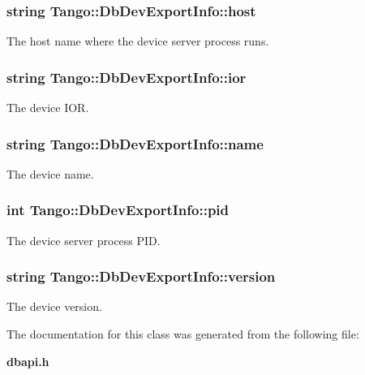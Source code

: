 \subsubsection[{host}]{\setlength{\rightskip}{0pt plus 5cm}string Tango\-::\-Db\-Dev\-Export\-Info\-::host}\label{classTango_1_1DbDevExportInfo_a110e2c28f3921258f4bed17f2543e1ac}


The host name where the device server process runs. 

\subsubsection[{ior}]{\setlength{\rightskip}{0pt plus 5cm}string Tango\-::\-Db\-Dev\-Export\-Info\-::ior}\label{classTango_1_1DbDevExportInfo_a4626c342371b6f0001ac684dc9d22ff5}


The device I\-O\-R. 

\subsubsection[{name}]{\setlength{\rightskip}{0pt plus 5cm}string Tango\-::\-Db\-Dev\-Export\-Info\-::name}\label{classTango_1_1DbDevExportInfo_a24c85a993aeb2e914f7c2c37aa4b949f}


The device name. 

\subsubsection[{pid}]{\setlength{\rightskip}{0pt plus 5cm}int Tango\-::\-Db\-Dev\-Export\-Info\-::pid}\label{classTango_1_1DbDevExportInfo_a140ed6681067ad229263d7f63be0212e}


The device server process P\-I\-D. 

\subsubsection[{version}]{\setlength{\rightskip}{0pt plus 5cm}string Tango\-::\-Db\-Dev\-Export\-Info\-::version}\label{classTango_1_1DbDevExportInfo_af88428a398f79b1f0da9b05bb727f173}


The device version. 



The documentation for this class was generated from the following file\-:\begin{DoxyCompactItemize}
\item 
{\bf dbapi.\-h}\end{DoxyCompactItemize}
